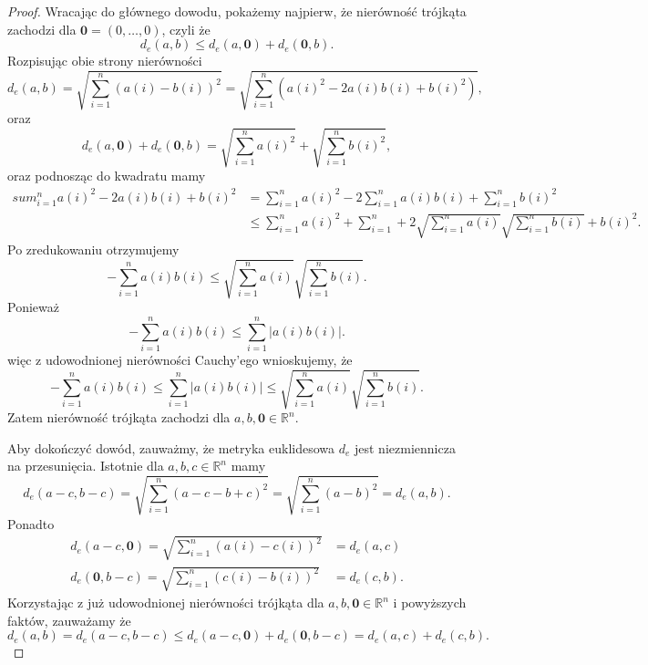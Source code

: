 \begin{proof}
Wracając do głównego dowodu, pokażemy najpierw, że nierówność trójkąta zachodzi dla $\mathbf{0} = \left( 0,\ldots, 0 \right) $, czyli że
\[
d_{e}\left( a,b \right) \le d_{e}\left( a, \mathbf{0} \right) + d_{e}\left( \mathbf{0}, b \right) 
.\] 
Rozpisując obie strony nierówności
\[
d_{e}\left( a,b \right) = \sqrt{\sum_{i = 1}^{n} \left( a\left( i \right) - b\left( i \right)  \right) ^2 } = \sqrt{\sum_{i = 1}^{n} \left( a\left( i \right) ^2 -2a\left( i \right) b\left( i \right) + b\left( i \right) ^2 \right) }
,\] 
oraz 
 \[
d_{e}\left( a, \mathbf{0} \right) + d_{e}\left( \mathbf{0}, b \right) = \sqrt{\sum_{i = 1}^{n} a\left( i \right) ^2 } + \sqrt{\sum_{i = 1}^{n} b\left( i \right) ^2 }  
,\] 
oraz podnosząc do kwadratu mamy
\begin{align*}
	sum_{i = 1}^{n} a\left( i \right) ^2 - 2a\left( i \right) b\left( i \right) + b\left( i \right) ^2 &= \sum_{i = 1}^{n} a\left( i \right) ^2 - 2\sum_{i = 1}^{n} a\left( i \right) b\left( i \right) + \sum_{i = 1}^{n} b\left( i \right) ^2 \\										   &\le \sum_{i = 1}^{n} a\left( i \right) ^2 + \sum_{i = 1}^{n} +2\sqrt{\sum_{i = 1}^{n} a\left( i \right)  } \sqrt{\sum_{i = 1}^{n} b\left( i \right)  } +  b\left( i \right) ^2 
.\end{align*}
Po zredukowaniu otrzymujemy
\[
-\sum_{i = 1}^{n} a\left( i \right) b\left( i \right) \le \sqrt{\sum_{i = 1}^{n} a\left( i \right)  }  \sqrt{\sum_{i = 1}^{n} b\left( i \right)  } 
.\] 
Ponieważ 
\[
-\sum_{i = 1}^{n} a\left( i \right) b\left( i \right) \le \sum_{i = 1}^{n} \left| a\left( i \right) b\left( i \right)  \right|
.\] 
więc z udowodnionej nierówności Cauchy'ego wnioskujemy, że
\[
-\sum_{i = 1}^{n} a\left( i \right) b\left( i \right) \le \sum_{i = 1}^{n} \left| a\left( i \right) b\left( i \right)  \right| \le \sqrt{\sum_{i = 1}^{n} a\left( i \right)  }  \sqrt{\sum_{i = 1}^{n} b\left( i \right)  } 
.\] 
Zatem nierówność trójkąta zachodzi dla $a,b, \mathbf{0} \in \mathbb{R}^{n}$.

Aby dokończyć dowód, zauważmy, że metryka euklidesowa $d_{e}$ jest niezmiennicza na przesunięcia. Istotnie dla  $a,b,c \in \mathbb{R}^{n}$ mamy
 \[
d_{e}\left( a-c, b-c \right) = \sqrt{\sum_{i = 1}^{n} \left( a-c - b + c \right) ^{2} } = \sqrt{\sum_{i = 1}^{n} \left( a-b \right) ^2 } = d_{e}\left( a,b \right) 
.\] 
Ponadto
\begin{align*}
		d_{e}\left( a-c, \mathbf{0} \right) = \sqrt{\sum_{i = 1}^{n} \left( a\left( i \right) - c\left( i \right)  \right) ^2 } &= d_{e}\left( a,c \right) \\
	d_{e}\left( \mathbf{0}, b-c \right) =  \sqrt{\sum_{i = 1}^{n} \left( c\left( i \right) -b\left( i \right)  \right) ^2 } &= d_{e}\left( c,b \right)  
.\end{align*}
Korzystając z już udowodnionej nierówności trójkąta dla $a,b,\mathbf{0} \in \mathbb{R}^{n}$ i powyższych faktów, zauważamy że
\[
d_{e}\left( a,b \right) = d_{e}\left( a-c, b-c \right) \le d_{e}\left( a-c, \mathbf{0} \right) + d_{e}\left( \mathbf{0}, b-c \right) = d_{e}\left( a,c \right) + d_{e}\left( c,b \right) 
.\] 
\end{proof} 
